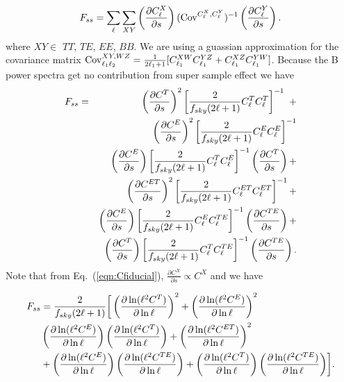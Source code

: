 \documentclass[prd,onecolumn,amsmath,amssymb,floatfix,superscriptaddress,notitlepage]{revtex4-1}
\def\ba{\begin{eqnarray}}
\def\ea{\end{eqnarray}}
\newcommand{\refeq}[1]{Eq.~(\ref{eqn:#1})}
\begin{document}
\begin{equation}
F_{ss} = 
\sum_{\ell}\sum_{XY}\left(\frac{\partial C_{\ell}^{X}}{\partial s}\right)({\rm Cov}^{C_{\ell}^{X},C_{\ell}^{Y}})^{-1}\left(\frac{\partial C_{\ell}^{Y}}{\partial s}\right).
\end{equation}
where $XY\in$ $TT$, $TE$, $EE$, $BB$. We are using a guassian approximation for the covariance matrix ${\rm Cov}^{XY,WZ}_{\ell_1 \ell_2}  ={1 \over 2\ell_1+1} [ C_{\ell_1}^{XW}C_{\ell_1}^{YZ} + C_{\ell_1}^{XZ}C_{\ell_1}^{YW}]$. Because the B power spectra get no contribution from super sample effect we have
\ba\label{eqn:fishertot1}
F_{ss} &=& \left(\frac{\partial C^{T}}{\partial s}\right)^{2} \left[{2 \over f_{sky}(2\ell+1)}  C_{\ell}^{T}C_{\ell}^{T} \right]^{-1}\ +\nonumber\\ 
&&\left(\frac{\partial C^{E}}{\partial s}\right)^{2} \left[{2 \over f_{sky}(2\ell+1)}  C_{\ell}^{E}C_{\ell}^{E} \right]^{-1}\nonumber\\
&&\left(\frac{\partial C^{E}}{\partial s}\right) \left[{2 \over f_{sky}(2\ell+1)}  C_{\ell}^{T}C_{\ell}^{E} \right]^{-1}\left(\frac{\partial C^{T}}{\partial s}\right) +\nonumber\\
&&\left(\frac{\partial C^{ET}}{\partial s}\right)^{2} \left[{2 \over f_{sky}(2\ell+1)}  C_{\ell}^{ET}C_{\ell}^{ET} \right]^{-1} +\nonumber\\
&&\left(\frac{\partial C^{E}}{\partial s}\right) \left[{2 \over f_{sky}(2\ell+1)}  C_{\ell}^{E}C_{\ell}^{TE} \right]^{-1}\left(\frac{\partial C^{TE}}{\partial s}\right) +\nonumber\\
&&\left(\frac{\partial C^{T}}{\partial s}\right) \left[{2 \over f_{sky}(2\ell+1)}  C_{\ell}^{T}C_{\ell}^{TE} \right]^{-1}\left(\frac{\partial C^{TE}}{\partial s}\right).
\ea
Note that from \refeq{Cfiducial}, $\frac{\partial C^{X}}{\partial s}\propto C^{X}$ and we have


\begin{align}\label{eqn:fishertot2}
F_{ss} &= {2 \over f_{sky}(2\ell+1)} \biggr[\left(\frac{\partial \ln(\ell^{2}C^{T})}{\partial \ln\ell}\right)^{2}  + \left(\frac{\partial \ln(\ell^{2}C^{E})}{\partial \ln\ell}\right)^{2}\nonumber \\
& \left(\frac{\partial \ln(\ell^{2}C^{E})}{\partial \ln\ell}\right)\left(\frac{\partial \ln(\ell^{2}C^{T})}{\partial \ln\ell}\right) + \left(\frac{\partial \ln(\ell^{2}C^{ET})}{\partial \ln\ell}\right)^{2}\nonumber\\
&+ \left(\frac{\partial \ln(\ell^{2}C^{E})}{\partial \ln\ell}\right)\left(\frac{\partial \ln(\ell^{2}C^{TE})}{\partial \ln\ell}\right)+ \left(\frac{\partial \ln(\ell^{2}C^{T})}{\partial \ln\ell}\right)\left(\frac{\partial \ln(\ell^{2}C^{TE})}{\partial \ln\ell}\right)\biggr].
\end{align}
\end{document}
